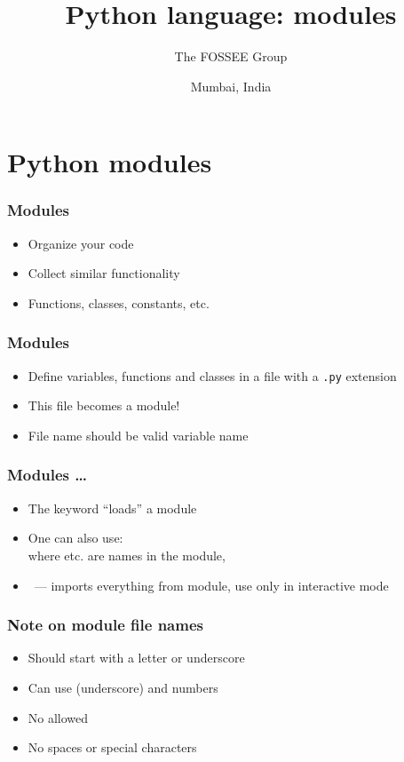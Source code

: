 \documentclass[14pt,compress]{beamer}
\title[Modules]{Python language: modules}
\author[FOSSEE Team] {The FOSSEE Group}
\institute[IIT Bombay] {Department of Aerospace Engineering\\IIT Bombay}
\date[] {Mumbai, India}
\begin{document}
\begin{frame}
  \titlepage
\end{frame}

\section{Python modules}

\begin{frame}
  \frametitle{Modules}
  \begin{itemize}
      \item Organize your code
      \item Collect similar functionality
      \item Functions, classes, constants, etc.
  \end{itemize}
\end{frame}

\begin{frame}
  \frametitle{Modules}
  \begin{itemize}
  \item Define variables, functions and classes in a file with a
    \texttt{.py} extension
  \item This file becomes a module!
  \item File name should be valid variable name
  \end{itemize}
\end{frame}

\begin{frame}
  \frametitle{Modules \ldots}
  \begin{itemize}
  \item The  keyword ``loads'' a module
  \item One can also use:
    \mbox{}\\
    where  etc. are names in the module, 
  \item {} \ --- imports everything from module,
    \alert{use only in interactive mode}
  \end{itemize}
\end{frame}

\begin{frame}[fragile]
  \frametitle{Note on module file names}
  \begin{itemize}
  \item Should start with a letter or underscore
  \item Can use \typ{\_} (underscore) and numbers
  \item No  allowed
  \item No spaces or special characters
  \end{itemize}
\end{frame}
\end{document}

